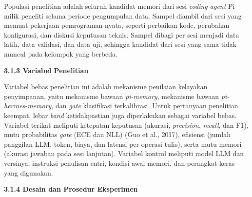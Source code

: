 \documentclass[12pt,a4paper]{article}
\newcommand{\asing}[1]{\textit{#1}}
\newcommand{\pim}{\textit{pi-memory}}
\newcommand{\phm}{\textit{pi-hermes-memory}}
\newcommand{\subsubbab}[2]{%
  \par\vspace{0.5em}\phantomsection\label{#2}%
  \noindent\textbf{#1}\par\nopagebreak\vspace{0.2em}}
\begin{document}
Populasi penelitian adalah seluruh kandidat memori dari sesi \asing{coding agent} Pi milik peneliti selama periode pengumpulan data. Sampel diambil dari sesi yang memuat pekerjaan pemrograman nyata, seperti perbaikan kode, perubahan konfigurasi, dan diskusi keputusan teknis. Sampel dibagi per sesi menjadi data latih, data validasi, dan data uji, sehingga kandidat dari sesi yang sama tidak muncul pada kelompok yang berbeda.

\subsubbab{3.1.3 Variabel Penelitian}{sec:3.1.3}

Variabel bebas penelitian ini adalah mekanisme penilaian kelayakan penyimpanan, yaitu mekanisme bawaan \pim{}, mekanisme bawaan \phm{}, dan \asing{gate} klasifikasi terkalibrasi. Untuk pertanyaan penelitian keempat, lebar \asing{band} ketidakpastian juga diperlakukan sebagai variabel bebas. Variabel terikat meliputi ketepatan keputusan (akurasi, \asing{precision}, \asing{recall}, dan F1), mutu probabilitas \asing{gate} (ECE dan NLL) (Guo et al., 2017), efisiensi (jumlah panggilan LLM, token, biaya, dan latensi per operasi tulis), serta mutu memori (akurasi jawaban pada sesi lanjutan). Variabel kontrol meliputi model LLM dan versinya, instruksi penulisan entri, kondisi awal memori, dan perangkat keras yang digunakan.

\subsubbab{3.1.4 Desain dan Prosedur Eksperimen}{sec:3.1.4}
\end{document}
